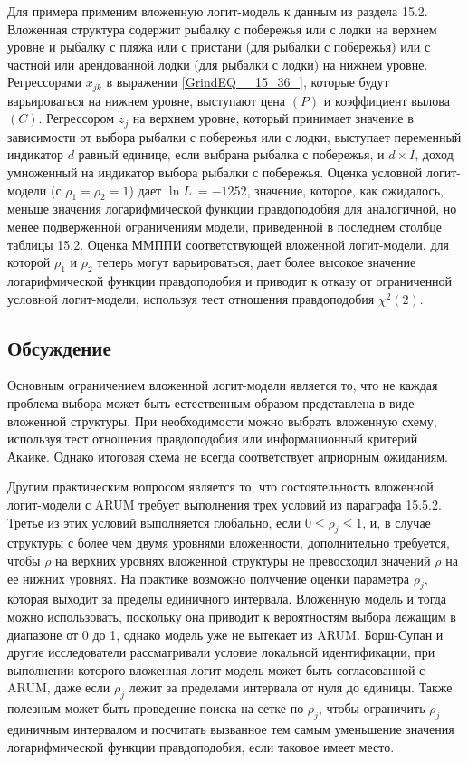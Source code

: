 Для примера применим вложенную логит-модель к данным из раздела 15.2. Вложенная структура содержит рыбалку с побережья или с лодки на верхнем уровне и рыбалку с пляжа или с пристани (для рыбалки с побережья) или с частной или арендованной лодки (для рыбалки с лодки) на нижнем уровне. Регрессорами $x_{jk}$ в выражении \eqref{GrindEQ__15_36_}, которые будут варьироваться на нижнем уровне, выступают цена $(P)$ и коэффициент вылова $\left(C\right).$ Регрессором $z_j$ на верхнем уровне, который принимает значение в зависимости от выбора рыбалки с побережья или с лодки, выступает переменный индикатор $d$ равный единице, если выбрана рыбалка с побережья, и $d\times I$, доход умноженный на индикатор выбора рыбалки с побережья. Оценка условной логит-модели (с ${\rho }_1={\rho }_2=1$) дает  ${\ln  L\ }=-1252$, значение, которое, как ожидалось, меньше значения логарифмической функции правдоподобия для аналогичной, но менее подверженной ограничениям модели, приведенной в последнем столбце таблицы 15.2. Оценка ММППИ соответствующей вложенной логит-модели, для которой ${\rho }_1$ и ${\rho }_2$ теперь могут варьироваться, дает более высокое значение логарифмической функции правдоподобия и приводит к отказу от ограниченной условной логит-модели, используя тест отношения правдоподобия $\chi^2(2)$.

\subsection{Обсуждение}

Основным ограничением вложенной логит-модели является то, что не каждая проблема выбора может  быть естественным образом представлена в виде вложенной структуры. При необходимости можно выбрать вложенную схему, используя тест отношения правдоподобия или информационный критерий Акаике. Однако итоговая схема не всегда соответствует априорным ожиданиям.

Другим практическим вопросом является то, что состоятельность вложенной логит-модели с  ARUM требует выполнения трех условий из параграфа 15.5.2. 
Третье из этих условий выполняется глобально, если $0\le {\rho }_j\le 1$, и, в случае структуры с более чем двумя уровнями вложенности, дополнительно требуется, чтобы $\rho $ на верхних уровнях вложенной структуры не превосходил значений $\rho $ на ее нижних уровнях. 
На практике возможно получение оценки параметра ${\rho }_j$, которая выходит за пределы единичного интервала. Вложенную модель и тогда можно использовать, поскольку она приводит к вероятностям выбора лежащим в диапазоне от 0 до 1, однако модель уже не вытекает из ARUM. Борш-Супан и другие исследователи рассматривали условие локальной идентификации, при выполнении которого вложенная логит-модель может быть согласованной с ARUM, даже если ${\rho }_j$ лежит за пределами интервала от нуля до единицы. Также полезным может быть проведение  поиска на сетке по ${\rho }_j$, чтобы ограничить ${\rho }_j$ единичным интервалом и посчитать вызванное тем самым уменьшение значения логарифмической функции правдоподобия, если таковое имеет место.

